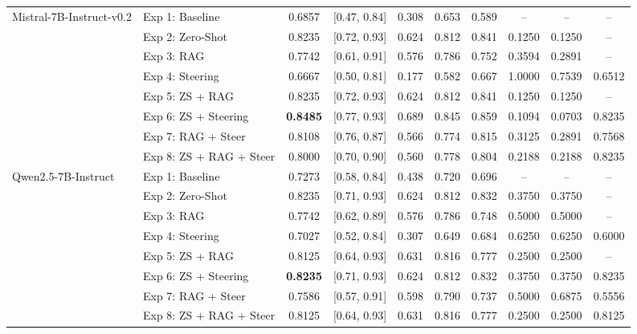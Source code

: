 \documentclass{ieeeaccess}
\begin{document}
\begin{table}[htbp]
{\begin{tabular}{llcccccccc}
\multirow{8}{*}{Mistral-7B-Instruct-v0.2}
& Exp 1: Baseline         & 0.6857 & [0.47, 0.84] & 0.308 & 0.653 & 0.589 & --     & -- & -- \\
& Exp 2: Zero-Shot        & 0.8235 & [0.72, 0.93] & 0.624 & 0.812 & 0.841 & 0.1250 & 0.1250 & -- \\
& Exp 3: RAG              & 0.7742 & [0.61, 0.91] & 0.576 & 0.786 & 0.752 & 0.3594 & 0.2891 & -- \\
& Exp 4: Steering         & 0.6667 & [0.50, 0.81] & 0.177 & 0.582 & 0.667 & 1.0000 & 0.7539 & 0.6512 \\
& Exp 5: ZS + RAG         & 0.8235 & [0.72, 0.93] & 0.624 & 0.812 & 0.841 & 0.1250 & 0.1250 & -- \\
& Exp 6: ZS + Steering    & \textbf{0.8485} & [0.77, 0.93] & 0.689 & 0.845 & 0.859 & 0.1094 & 0.0703 & 0.8235 \\
& Exp 7: RAG + Steer      & 0.8108 & [0.76, 0.87] & 0.566 & 0.774 & 0.815 & 0.3125 & 0.2891 & 0.7568 \\
& Exp 8: ZS + RAG + Steer & 0.8000 & [0.70, 0.90] & 0.560 & 0.778 & 0.804 & 0.2188 & 0.2188 & 0.8235 \\

\hline

\multirow{8}{*}{Qwen2.5-7B-Instruct}
& Exp 1: Baseline         & 0.7273 & [0.58, 0.84] & 0.438 & 0.720 & 0.696 & --     & -- & -- \\
& Exp 2: Zero-Shot        & 0.8235 & [0.71, 0.93] & 0.624 & 0.812 & 0.832 & 0.3750 & 0.3750 & -- \\
& Exp 3: RAG              & 0.7742 & [0.62, 0.89] & 0.576 & 0.786 & 0.748 & 0.5000 & 0.5000 & -- \\
& Exp 4: Steering         & 0.7027 & [0.52, 0.84] & 0.307 & 0.649 & 0.684 & 0.6250 & 0.6250 & 0.6000 \\
& Exp 5: ZS + RAG         & 0.8125 & [0.64, 0.93] & 0.631 & 0.816 & 0.777 & 0.2500 & 0.2500 & -- \\
& Exp 6: ZS + Steering    & \textbf{0.8235} & [0.71, 0.93] & 0.624 & 0.812 & 0.832 & 0.3750 & 0.3750 & 0.8235 \\
& Exp 7: RAG + Steer      & 0.7586 & [0.57, 0.91] & 0.598 & 0.790 & 0.737 & 0.5000 & 0.6875 & 0.5556 \\
& Exp 8: ZS + RAG + Steer & 0.8125 & [0.64, 0.93] & 0.631 & 0.816 & 0.777 & 0.2500 & 0.2500 & 0.8125 \\

\hline


\end{tabular}}
\end{table}
\end{document}
